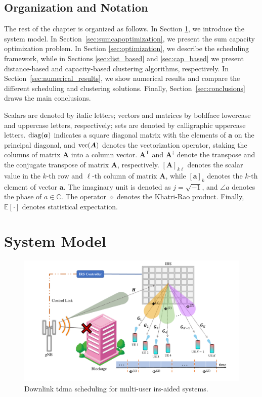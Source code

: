 \subsection{Organization and Notation}
The rest of the chapter is organized as follows. In Section \ref{sec:system_model_irs_tdma}, we introduce the system model. In Section~\ref{sec:sumcapoptimization}, we present the sum capacity optimization problem. In Section \ref{sec:optimization}, we describe the scheduling framework, while in Sections \ref{sec:dist_based} and \ref{sec:cap_based} we present distance-based and capacity-based clustering algorithms, respectively. In Section~\ref{sec:numerical_results}, we show numerical results and compare the different scheduling and clustering solutions. Finally, Section~\ref{sec:conclusions} draws the main conclusions.

Scalars are denoted by italic letters; vectors and matrices by boldface lowercase and uppercase letters, respectively; sets are denoted by calligraphic uppercase letters.
$\operatorname*{diag}(\bm{a})$ indicates a square diagonal matrix with the elements of $\bm{a}$ on the principal diagonal, and $\operatorname*{vec}(\bm{A})$ denotes the vectorization operator, staking the columns of matrix $\bm{A}$ into a column vector. 
$\bm{A}^{\mathrm T}$ and $\bm{A}^\dagger$ denote the transpose and the conjugate transpose of matrix $\bm{A}$, respectively. 
$[\bm{A}]_{k \ell}$ denotes the scalar value in the $k$-th row and $\ell$-th column of matrix $\bm{A}$, while $[\bm{a}]_k$ denotes the $k$-th element of vector $\bm{a}$. 
The imaginary unit is denoted as $j =\sqrt{-1}$, and $\angle a$ denotes the phase of $a \in \mathbb{C}$. 
The operator $\diamond$ denotes the Khatri-Rao product.
Finally, $\mathbb{E}[\cdot]$ denotes statistical expectation.


\section{System Model}
\label{sec:system_model_irs_tdma}

\begin{figure}[t]
    \centering
    \includegraphics[width=\linewidth, trim={2.8cm 0 1.8cm 0},clip]{Figures/IrsClustering/journal_sysmod.pdf}
    \caption{Downlink \gls{tdma} scheduling for multi-user \gls{irs}-aided systems.}
    \label{fig:system_model}
\end{figure}

